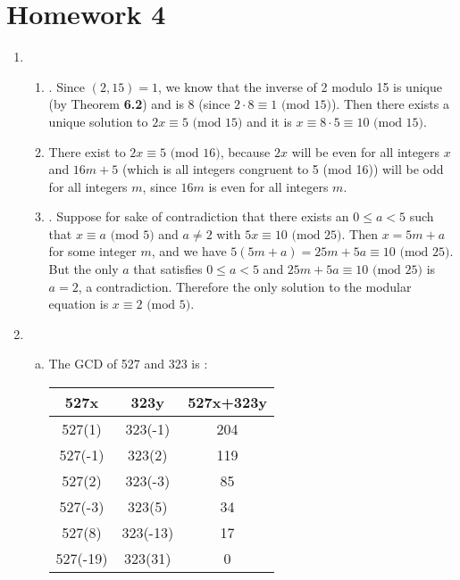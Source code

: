 \section{Homework 4}

\begin{enumerate}
    \item \begin{enumerate}
        \item {}. Since $(2,15)=1$, we know that the inverse of 2 modulo 15 is unique (by Theorem \textbf{6.2}) and is 8 (since $2\cdot 8\equiv 1\text{ (mod 15)}$). Then there exists a unique solution to $2x\equiv 5\text{ (mod 15)}$ and it is $x\equiv 8\cdot5\equiv 10\text{ (mod 15)}$.
        
        \item There exist  to $2x\equiv 5\text{ (mod 16)}$, because $2x$ will be even for all integers $x$ and $16m+5$ (which is all integers congruent to 5 (mod 16)) will be odd for all integers $m$, since $16m$ is even for all integers $m$.
        
        \item {}. Suppose for sake of contradiction that there exists an $0\leq a<5$ such that $x\equiv a\text{ (mod 5)}$ and $a\neq 2$ with $5x\equiv10\text{ (mod 25)}$. Then $x=5m+a$ for some integer $m$, and we have $5(5m+a)=25m+5a\equiv10\text{ (mod 25)}$. But the only $a$ that satisfies $0\leq a<5$ and $25m+5a\equiv10\text{ (mod 25)}$ is $a=2$, a contradiction. Therefore the only solution to the modular equation is $x\equiv 2\text{ (mod 5)}$.
    \end{enumerate}
    
    \item \begin{enumerate}[(a)]
        \item The GCD of 527 and 323 is :
        
        \begin{tabular}{cc|c}
            527x & 323y & 527x+323y \\
            \hline
            527(1) & 323(-1) & 204 \\
            527(-1) & 323(2) & 119 \\
            527(2) & 323(-3) & 85 \\
            527(-3) & 323(5) & 34 \\
            527(8) & 323(-13) & 17 \\
            527(-19) & 323(31) & 0
        \end{tabular}


\end{enumerate}
\end{enumerate}
